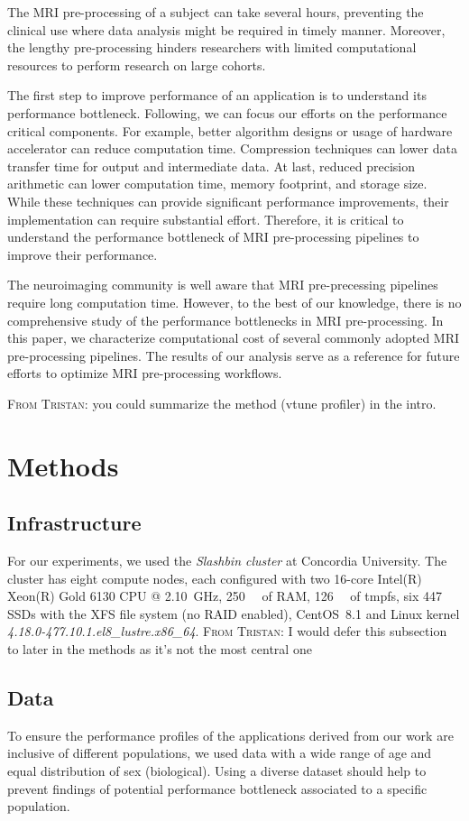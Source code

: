 \documentclass[conference]{IEEEtran}
\newcommand{\TG}[1]{\color{blue}\textsc{From Tristan: }#1\color{black}}
\begin{document}
The MRI pre-processing of a subject can take several hours, preventing the clinical use where data analysis might be required in timely manner. Moreover, the lengthy pre-processing hinders researchers with limited computational resources to perform research on large cohorts.

The first step to improve performance of an application is to understand its performance bottleneck. Following, we can focus our efforts on the performance critical components. For example, better algorithm designs or usage of hardware accelerator can reduce computation time. Compression techniques can lower data transfer time for output and intermediate data. At last, reduced precision arithmetic can lower computation time, memory footprint, and storage size. While these techniques can provide significant performance improvements, their implementation can require substantial effort. Therefore, it is critical to understand the performance bottleneck of MRI pre-processing pipelines to improve their performance.

The neuroimaging community is well aware that MRI pre-precessing pipelines require long computation time. However, to the best of our knowledge, there is no comprehensive study of the performance bottlenecks in MRI pre-processing. In this paper, we characterize computational cost of several commonly adopted MRI pre-processing pipelines. The results of our analysis serve as a reference for future efforts to optimize MRI pre-processing workflows.

\TG{you could summarize the method (vtune profiler) in the intro.}

\section{Methods}
\subsection{Infrastructure}
For our experiments, we used the \textit{Slashbin cluster} at Concordia University. The cluster has eight compute nodes, each configured with two 16-core Intel(R) Xeon(R) Gold 6130 CPU @ \SI{2.10}{\giga\hertz}, \SI{250}{\gibi\byte} of RAM, \SI{126}{\gibi\byte} of tmpfs, six \SI{447}{\gibi\byte} SSDs with the XFS file system (no RAID enabled), CentOS~8.1 and Linux kernel \textit{4.18.0-477.10.1.el8\_lustre.x86\_64}. \TG{I would defer this subsection to later in the methods as it's not the most central one}

\subsection{Data}
To ensure the performance profiles of the applications derived from our work are inclusive of different populations, we used data with a wide range of age and equal distribution of sex (biological). Using a diverse dataset should help to prevent findings of potential performance bottleneck associated to a specific population.
\end{document}
